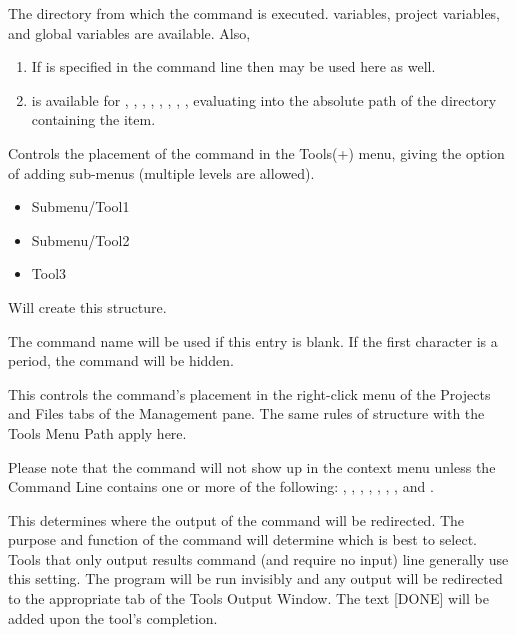 
The directory from which the command is executed. \codeblocks variables, project variables, and global variables are available. Also,

\begin{enumerate}
\item If  is specified in the command line then  may be used here as well.
\item {} is available for , , , , , , , , evaluating into the absolute path of the directory containing the item.
\end{enumerate}


Controls the placement of the command in the Tools(+) menu, giving the option of adding sub-menus (multiple levels are allowed).

\begin{itemize}
  \item Submenu/Tool1
  \item Submenu/Tool2
  \item Tool3
\end{itemize}

Will create this structure.


The command name will be used if this entry is blank. If the first character is a period, the command will be hidden.


This controls the command's placement in the right-click menu of the Projects and Files tabs of the Management pane. The same rules of structure with the Tools Menu Path apply here.


Please note that the command will not show up in the context menu unless the Command Line contains one or more of the following: , , , , , , , and .


This determines where the output of the command will be redirected. The purpose and function of the command will determine which is best to select.
Tools that only output results command (and require no input) line generally use this setting. The program will be run invisibly and any output will be redirected to the appropriate tab of the Tools Output Window. The text [DONE] will be added upon the tool's completion.

